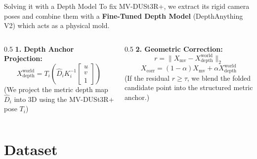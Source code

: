 \documentclass[aspectratio=169]{beamer}
\begin{document}
\begin{frame}{Solving it with a Depth Model}
    To fix MV-DUSt3R+, we extract its rigid camera poses and combine them with a \textbf{Fine-Tuned Depth Model} (DepthAnything V2) which acts as a physical mold.
    \vspace{0.2cm}
    \begin{columns}
        \begin{column}{0.5\textwidth}
            \textbf{1. Depth Anchor Projection:}
            \begin{equation*}
                X_{\mathrm{depth}}^{\mathrm{world}} = T_i \left( \hat{D}_i K_i^{-1}\begin{bmatrix}u\\v\\1\end{bmatrix} \right)
            \end{equation*}
            \small (We project the metric depth map $\hat{D}_i$ into 3D using the MV-DUSt3R+ pose $T_i$)
        \end{column}
        \begin{column}{0.5\textwidth}
            \textbf{2. Geometric Correction:}
            \begin{equation*}
                r = \| X_{\mathrm{mv}} - X_{\mathrm{depth}}^{\mathrm{world}} \|_2
            \end{equation*}
            \begin{equation*}
                X_{\mathrm{corr}} = (1-\alpha)X_{\mathrm{mv}} + \alpha X_{\mathrm{depth}}^{\mathrm{world}}
            \end{equation*}
            \small (If the residual $r \geq \tau$, we blend the folded candidate point into the structured metric anchor.)
        \end{column}
    \end{columns}
\end{frame}

\section{Dataset}
\end{document}
